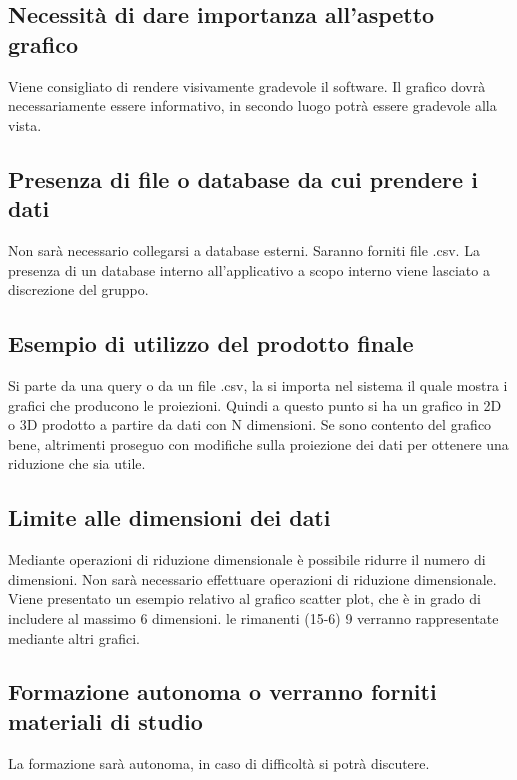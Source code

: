 \documentclass{article}
\begin{document}
    \subsection{Necessità di dare importanza all'aspetto grafico}
    \label{sub:domanda_11}
    Viene consigliato di rendere visivamente gradevole il software. Il grafico dovrà necessariamente essere informativo, in secondo luogo potrà essere gradevole alla vista.

    \subsection{Presenza di file o database da cui prendere i dati}
    \label{sub:domanda_12}
    Non sarà necessario collegarsi a database esterni. Saranno forniti file .csv. La presenza di un database interno all'applicativo a scopo interno viene lasciato a discrezione del gruppo.

    \subsection{Esempio di utilizzo del prodotto finale}
    \label{sub:domanda_13}
    Si parte da una query o da un file .csv, la si importa nel sistema il quale mostra i grafici che producono le proiezioni. Quindi a questo punto si ha un grafico in 2D o 3D prodotto a partire da dati con N dimensioni. Se sono contento del grafico bene, altrimenti proseguo con modifiche sulla proiezione dei dati per ottenere una riduzione che sia utile.

    \subsection{Limite alle dimensioni dei dati}
    \label{sub:domanda_14}
    Mediante operazioni di riduzione dimensionale è possibile ridurre il numero di dimensioni. Non sarà necessario effettuare operazioni di riduzione dimensionale.  
    Viene presentato un esempio relativo al grafico scatter plot, che è in grado di includere al massimo 6 dimensioni. le rimanenti (15-6) 9 verranno rappresentate mediante altri grafici.

    \subsection{Formazione autonoma o verranno forniti materiali di studio}
    \label{sub:domanda_15}
    La formazione sarà autonoma, in caso di difficoltà si potrà discutere.
\end{document}
